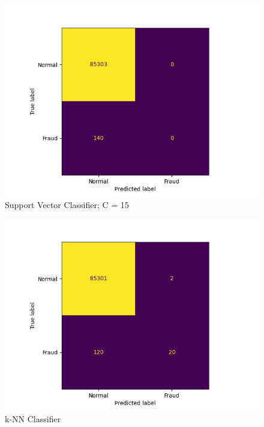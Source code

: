 \documentclass[letterpaper, 11 pt, conference]{ieeeconf}  %
\begin{document}
\begin{figure}[h]
    \centering
    \includegraphics[width=0.92\columnwidth]{Images/SVM_CF.png}
    \caption{Support Vector Classifier; C = 15}
    \label{fig:SVC_CF}
\end{figure}
\begin{figure}[h]
    \centering
    \includegraphics[width=\columnwidth]{Images/kNN_CF.png}
    \caption{k-NN Classifier}
    \label{fig:knn_CF}
\end{figure}
\end{document}
